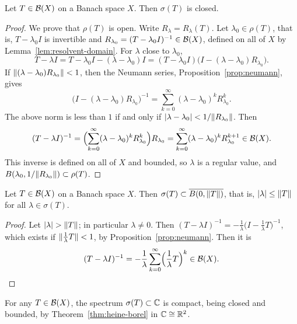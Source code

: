 \begin{theorem}\label{thm:closed-spectrum}
Let $T \in \mathcal{B}(X)$ on a Banach space $X$. Then $\sigma(T)$ is closed.
\end{theorem}

\begin{proof}
We prove that $\rho(T)$ is open. Write $R_\lambda = R_\lambda(T)$. Let
$\lambda_0 \in \rho(T)$, that is, $T - \lambda_0 I$ is invertible and
$R_{\lambda_0} = (T - \lambda_0 I)^{-1} \in \mathcal{B}(X)$, defined on all of $X$
by Lemma~\ref{lem:resolvent-domain}. For $\lambda$ close to $\lambda_0$,
\[
  T - \lambda I = T - \lambda_0 I - (\lambda - \lambda_0) I
  = (T - \lambda_0 I)\bigl(I - (\lambda - \lambda_0) R_{\lambda_0}\bigr) .
\]
If $\lVert(\lambda - \lambda_0) R_{\lambda_0}\rVert < 1$, then the Neumann series,
Proposition~\ref{prop:neumann}, gives
\[
  \bigl(I - (\lambda - \lambda_0) R_{\lambda_0}\bigr)^{-1}
  = \sum_{k=0}^{\infty} (\lambda - \lambda_0)^k R_{\lambda_0}^k .
\]
The above norm is less than $1$ if and only if
$\lvert\lambda - \lambda_0\rvert < 1 / \lVert R_{\lambda_0}\rVert$. Then
\[
  (T - \lambda I)^{-1}
  = \Bigl(\sum_{k=0}^{\infty} (\lambda - \lambda_0)^k R_{\lambda_0}^k\Bigr)
    R_{\lambda_0}
  = \sum_{k=0}^{\infty} (\lambda - \lambda_0)^k R_{\lambda_0}^{k+1}
  \in \mathcal{B}(X) .
\]
This inverse is defined on all of $X$ and bounded, so $\lambda$ is a regular
value, and $B(\lambda_0, 1/\lVert R_{\lambda_0}\rVert) \subset \rho(T)$.
\end{proof}

\begin{proposition}\label{prop:bounded-spectrum}
Let $T \in \mathcal{B}(X)$ on a Banach space $X$. Then
$\sigma(T) \subset \overline{B(0, \lVert T\rVert)}$, that is, $\lvert\lambda\rvert \le \lVert T\rVert$
for all $\lambda \in \sigma(T)$.
\end{proposition}

\begin{proof}
Let $\lvert\lambda\rvert > \lVert T\rVert$; in particular $\lambda \ne 0$. Then
$(T - \lambda I)^{-1} = -\frac{1}{\lambda}\bigl(I - \frac{1}{\lambda} T\bigr)^{-1}$,
which exists if $\lVert\frac{1}{\lambda} T\rVert < 1$, by
Proposition~\ref{prop:neumann}. Then it is
\[
  (T - \lambda I)^{-1}
  = -\frac{1}{\lambda} \sum_{k=0}^{\infty} \Bigl(\frac{1}{\lambda} T\Bigr)^k
  \in \mathcal{B}(X) . \qedhere
\]
\end{proof}

\begin{corollary}\label{cor:compact-spectrum}
For any $T \in \mathcal{B}(X)$, the spectrum $\sigma(T) \subset \mathbb{C}$ is compact,
being closed and bounded, by Theorem~\ref{thm:heine-borel} in
$\mathbb{C} \cong \mathbb{R}^2$.
\end{corollary}

